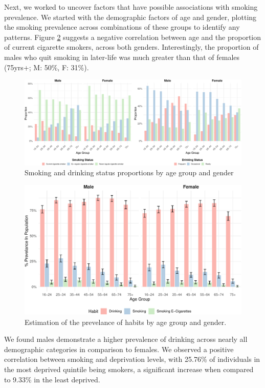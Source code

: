 \documentclass[
  11pt,
  twocolumn]{article}
\begin{document}
Next, we worked to uncover factors that have possible associations with
smoking prevalence. We started with the demographic factors of age and
gender, plotting the smoking prevalence across combinations of these
groups to identify any patterns. Figure \ref{fig:output-prevelance-plot}
suggests a negative correlation between age and the proportion of
current cigarette smokers, across both genders. Interestingly, the
proportion of males who quit smoking in later-life was much greater than
that of females (75yrs+; M: 50\%, F: 31\%).

\begin{figure}[H]
\includegraphics{Coursework_files/figure-latex/output-smoking-drinking-age-plot-1} \caption{Smoking and drinking status proportions by age group and gender}\label{fig:output-smoking-drinking-age-plot}
\end{figure}

\begin{figure}[H]
\includegraphics{Coursework_files/figure-latex/output-prevelance-plot-1} \caption{Estimation of the prevelance of habits by age group and gender.}\label{fig:output-prevelance-plot}
\end{figure}

We found males demonstrate a higher prevalence of drinking across nearly
all demographic categories in comparison to females. We observed a
positive correlation between smoking and deprivation levels, with
25.76\% of individuals in the most deprived quintile being smokers, a
significant increase when compared to 9.33\% in the least deprived.
\end{document}
